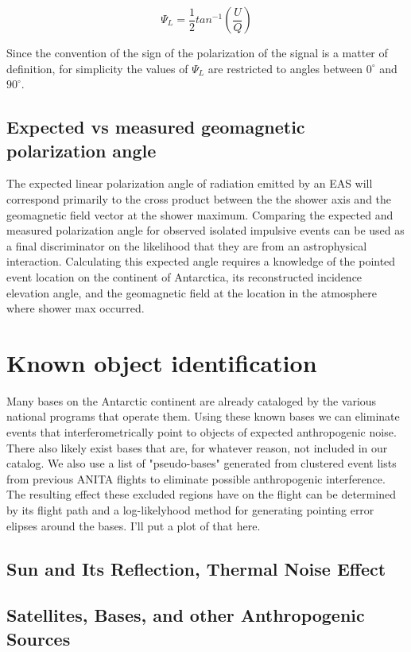 	\begin{equation}
		\Psi_{L} = \frac{1}{2}tan^{-1}(\frac{U}{Q})
	\label{eqn:polAngle}
	\end{equation}
		
		Since the convention of the sign of the polarization of the signal is a matter of definition, for simplicity the values of $\Psi_{L}$ are restricted to angles between $0^\circ$ and $90^\circ$.
		
	\subsection{Expected vs measured geomagnetic polarization angle}
		The expected linear polarization angle of radiation emitted by an EAS will correspond primarily to the cross product between the the shower axis and the geomagnetic field vector at the shower maximum.  Comparing the expected and measured polarization angle for observed isolated impulsive events can be used as a final discriminator on the likelihood that they are from an astrophysical interaction.  Calculating this expected angle requires a knowledge of the pointed event location on the continent of Antarctica, its reconstructed incidence elevation angle, and the geomagnetic field at the location in the atmosphere where shower max occurred.
		
		
\section{Known object identification}
	Many bases on the Antarctic continent are already cataloged by the various national programs that operate them.  Using these known bases we can eliminate events that interferometrically point to objects of expected anthropogenic noise.  There also likely exist bases that are, for whatever reason, not included in our catalog.  We also use a list of "pseudo-bases" generated from clustered event lists from previous ANITA flights to eliminate possible anthropogenic interference.  The resulting effect these excluded regions have on the flight can be determined by its flight path and a log-likelyhood method for generating pointing error elipses around the bases.  I'll put a plot of that here.
	\subsection{Sun and Its Reflection, Thermal Noise Effect}
	\subsection{Satellites, Bases, and other Anthropogenic Sources}

